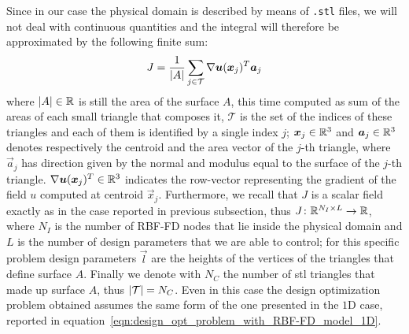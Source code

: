 Since in our case the physical domain is described by means of \verb*|.stl| files, we will not deal with continuous quantities and the integral will therefore be approximated by the following finite sum:
\begin{equation}
	J = \frac{1}{\lvert A\rvert} \sum_{j \in \mathcal{T}} \nabla \boldsymbol{u}(\boldsymbol{x}_j)^T \boldsymbol{a}_j
\end{equation}
where $\lvert A\rvert \in \mathbb{R}$ is still the area of the surface $A$, this time computed as sum of the areas of each small triangle that composes it, $\mathcal{T}$ is the set of the indices of these triangles and each of them is identified by a single index $j$; $\boldsymbol{x}_j \in \mathbb{R}^3$ and $\boldsymbol{a}_j \in \mathbb{R}^3$ denotes respectively the centroid and the area vector of the $j$-th triangle, where $\vec{a}_j$ has direction given by the normal and modulus equal to the surface of the $j$-th triangle.
$\nabla \boldsymbol{u}(\boldsymbol{x}_j)^T \in \mathbb{R}^3$ indicates the row-vector representing the gradient of the field $u$ computed at centroid $\vec{x}_j$.
Furthermore, we recall that $J$ is a scalar field exactly as in the case reported in previous subsection, thus $J \colon \mathbb{R}^{N_I \times L} \to \mathbb{R}$, where $N_I$ is the number of RBF-FD nodes that lie inside the physical domain and $L$ is the number of design parameters that we are able to control; for this specific problem design parameters $\vec{l}$ are the heights of the vertices of the triangles that define surface $A$. Finally we denote with $N_C$ the number of stl triangles that made up surface $A$, thus $\lvert\mathcal{T}\rvert = N_C$. Even in this case the design optimization problem obtained assumes the same form of the one presented in the $1$D case, reported in equation~\eqref{eqn:design_opt_problem_with_RBF-FD_model_1D}.


